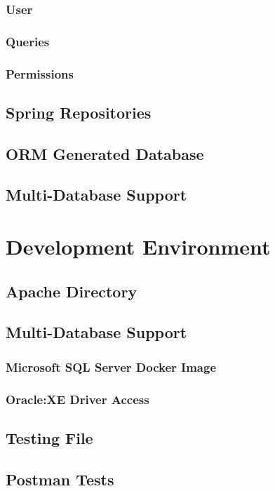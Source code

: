 \subsubsection{User}
\subsubsection{Queries}
\subsubsection{Permissions}
\subsection{Spring Repositories}
\subsection{ORM Generated Database}
\subsection{Multi-Database Support}

\section{Development Environment}\label{cha:implementation:sec:development}

\subsection{Apache Directory}
\subsection{Multi-Database Support}
\subsubsection{Microsoft SQL Server Docker Image}
\subsubsection{Oracle:XE Driver Access}
\subsection{Testing File}
\subsection{Postman Tests}

